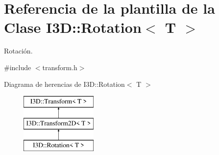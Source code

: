 \hypertarget{class_i3_d_1_1_rotation}{}\section{Referencia de la plantilla de la Clase I3D\+:\+:Rotation$<$ T $>$}
\label{class_i3_d_1_1_rotation}


Rotación.  




{\ttfamily \#include $<$transform.\+h$>$}

Diagrama de herencias de I3D\+:\+:Rotation$<$ T $>$\begin{figure}[H]
\begin{center}
\leavevmode
\includegraphics[height=3.000000cm]{class_i3_d_1_1_rotation}
\end{center}
\end{figure}
